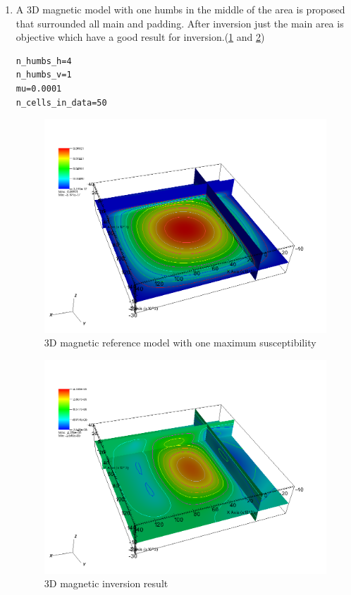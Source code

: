 \begin{enumerate}
\item A 3D magnetic model with one humbs in the middle of the area is proposed that surrounded all main and padding. After inversion just the main area is objective which have a good result for inversion.(\ref{fig:mag3D1-ref} and \ref{fig:mag3D1})

\begin{verbatim}
n_humbs_h=4
n_humbs_v=1
mu=0.0001
n_cells_in_data=50
\end{verbatim}

\begin{figure}
\centering
\includegraphics[width=\textwidth]{mag3D1-ref.png}
\caption{3D magnetic reference model with one maximum susceptibility}
\label{fig:mag3D1-ref}
\end{figure}

\begin{figure}
\centering
\includegraphics[width=\textwidth]{mag3D1.png}
\caption{3D magnetic inversion result}
\label{fig:mag3D1}
\end{figure}
\end{enumerate}
